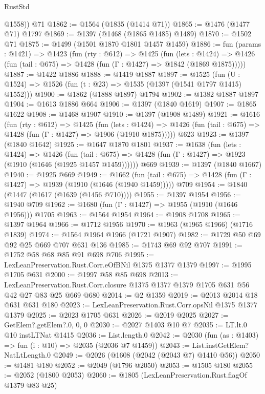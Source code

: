 \begin{lexlean}{RustStd}
\begin{coremodule}
        @1558))
    @71
@1862 := @1564 (@1835 (@1414 @71))
@1865 := @1476 (@1477 @71) @1797
@1869 := @1397 (@1468 (@1865 @1485) @1489)
@1870 := @1502 @71
@1875 := @1499 (@1501 @1870 @1801 @1457 @1459)
@1886 := fun (params : @1421) =>
  @1423
    (fun (rty : @612) =>
    @1425
      (fun (lets : @1424) =>
      @1426 (fun (tail : @675) => @1428 (fun (Γ : @1427) => @1842 (@1869 @1875)))))
@1887 := @1422 @1886
@1888 := @1419 @1887
@1897 := @1525 (fun (U : @1524) => @1526 (fun (t : @23) => @1535 (@1397 (@1541 @1797 @1415) @1552)))
@1900 := @1862 (@1888 @1897) @1794
@1902 := @1382 @1887 @1897
@1904 := @1613 @1886 @664
@1906 := @1397 (@1840 @1619)
@1907 := @1865 @1622
@1908 := @1468 @1907
@1910 := @1397 (@1908 @1489)
@1921 := @1616
    (fun (rty : @612) =>
    @1425
      (fun (lets : @1424) =>
      @1426 (fun (tail : @675) => @1428 (fun (Γ : @1427) => @1906 (@1910 @1875)))))
    @623
@1923 := @1397 (@1840 @1642)
@1925 := @1647 @1870 @1801
@1937 := @1638
    (fun (lets : @1424) =>
    @1426
      (fun (tail : @675) => @1428 (fun (Γ : @1427) => @1923 (@1910 (@1646 (@1925 @1457 @1459))))))
    @669
@1939 := @1397 (@1840 @1667)
@1940 := @1925 @669
@1949 := @1662
    (fun (tail : @675) => @1428 (fun (Γ : @1427) => @1939 (@1910 (@1646 (@1940 @1459)))))
    @709
@1954 := @1840 (@1447 (@1617 (@1639 (@1456 @710))))
@1955 := @1397 @1954
@1956 := @1940 @709
@1962 := @1680 (fun (Γ : @1427) => @1955 (@1910 (@1646 @1956))) @1705
@1963 := @1564 @1954
@1964 := @1908 @1708
@1965 := @1397 @1964
@1966 := @1712 @1956
@1970 := @1963 (@1965 @1966) (@1716 @1839)
@1974 := @1564 @1964 @1966 (@1721 @1907)
@1982 := @1729 @50 @69 @92 @25 @669 @707 @631 @136
@1985 := @1743 @69 @92 @707
@1991 := @1752 @58 @68 @85 @91 @698 @706
@1995 := LexLeanPreservation.Rust.Corr.eOfBNil @1375 @1377 @1379
@1997 := @1995 @1705 @631
@2000 := @1997 @58 @85 @698
@2013 := LexLeanPreservation.Rust.Corr.closure
    @1375
    @1377
    @1379
    @1705
    @631
    @56
    @42
    @27
    @83
    @25
    @669
    @680
@2014 := @2 @1359
@2019 := @2013 @2014 @18 @631 @631 @180
@2023 := LexLeanPreservation.Rust.Corr.opsNil @1375 @1377 @1379
@2025 := @2023 @1705 @631
@2026 := @2019 @2025
@2027 := GetElem?.getElem?.{0, 0, 0}
@2030 := @2027 @1403 @10 @7
@2035 := LT.lt.{0} @10 instLTNat @1415
@2036 := List.length.{0}
@2042 := @2030 (fun (as : @1403) => fun (i : @10) => @2035 (@2036 @7 @1459))
@2043 := List.instGetElem?NatLtLength.{0}
@2049 := @2026 (@1608 (@2042 (@2043 @7) @1410 @56))
@2050 := @1481 @180
@2052 := @2049 (@1796 @2050)
@2053 := @1505 @180
@2055 := @2052 (@1800 @2053)
@2060 := @1805 (LexLeanPreservation.Rust.flagOf @1379 @83 @25)

\end{coremodule}
\end{lexlean}
